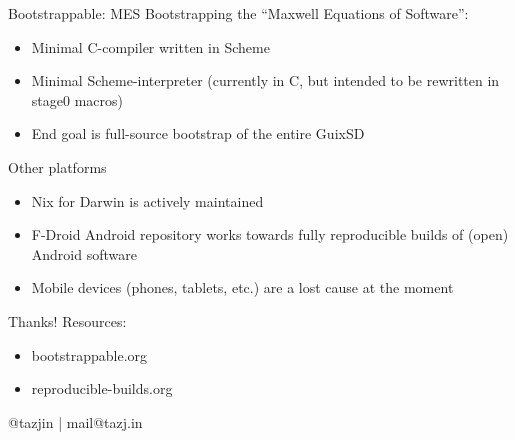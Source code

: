 \documentclass[12pt]{beamer}
\begin{document}
  \begin{frame}{Bootstrappable: MES}
    Bootstrapping the ``Maxwell Equations of Software'':

    \begin{itemize}
    \item Minimal C-compiler written in Scheme
    \item Minimal Scheme-interpreter (currently in C, but intended to
      be rewritten in stage0 macros)
    \item End goal is full-source bootstrap of the entire GuixSD
    \end{itemize}
  \end{frame}

  \begin{frame}{Other platforms}
    \begin{itemize}
    \item Nix for Darwin is actively maintained
    \item F-Droid Android repository works towards fully reproducible
      builds of (open) Android software
    \item Mobile devices (phones, tablets, etc.) are a lost cause at
      the moment
    \end{itemize}
  \end{frame}

  \begin{frame}{Thanks!}
    Resources:
    \begin{itemize}
    \item bootstrappable.org
    \item reproducible-builds.org
    \end{itemize}

    @tazjin | mail@tazj.in
  \end{frame}
\end{document}
